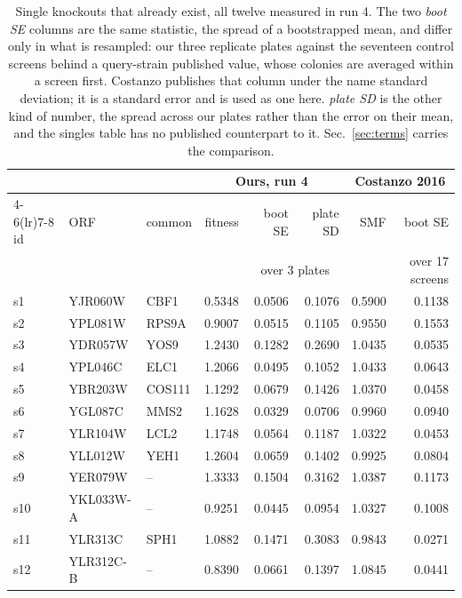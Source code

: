 \begin{table}[H]\centering
\footnotesize
\caption[]{Single knockouts that already exist, all twelve measured in run 4. The two \emph{boot SE} columns are the same statistic, the spread of a bootstrapped mean, and differ only in what is resampled: our three replicate plates against the seventeen control screens behind a query-strain published value, whose colonies are averaged within a screen first. Costanzo publishes that column under the name standard deviation; it is a standard error and is used as one here. \emph{plate SD} is the other kind of number, the spread across our plates rather than the error on their mean, and the singles table has no published counterpart to it. Sec.~\ref{sec:terms} carries the comparison.}\label{tab:existing-singles}
\begin{tabular}{lllrrrrr}
\toprule
& & & \multicolumn{3}{c}{Ours, run 4} & \multicolumn{2}{c}{Costanzo 2016} \\
\cmidrule(lr){4-6}\cmidrule(lr){7-8}
id & ORF & common & fitness & boot SE & plate SD & SMF & boot SE \\
 & & & & \multicolumn{2}{c}{\scriptsize over 3 plates} & & {\scriptsize over 17 screens} \\
\midrule
s1 & YJR060W & CBF1 & 0.5348 & 0.0506 & 0.1076 & 0.5900 & 0.1138 \\
s2 & YPL081W & RPS9A & 0.9007 & 0.0515 & 0.1105 & 0.9550 & 0.1553 \\
s3 & YDR057W & YOS9 & 1.2430 & 0.1282 & 0.2690 & 1.0435 & 0.0535 \\
s4 & YPL046C & ELC1 & 1.2066 & 0.0495 & 0.1052 & 1.0433 & 0.0643 \\
s5 & YBR203W & COS111 & 1.1292 & 0.0679 & 0.1426 & 1.0370 & 0.0458 \\
s6 & YGL087C & MMS2 & 1.1628 & 0.0329 & 0.0706 & 0.9960 & 0.0940 \\
s7 & YLR104W & LCL2 & 1.1748 & 0.0564 & 0.1187 & 1.0322 & 0.0453 \\
s8 & YLL012W & YEH1 & 1.2604 & 0.0659 & 0.1402 & 0.9925 & 0.0804 \\
s9 & YER079W & -- & 1.3333 & 0.1504 & 0.3162 & 1.0387 & 0.1173 \\
s10 & YKL033W-A & -- & 0.9251 & 0.0445 & 0.0954 & 1.0327 & 0.1008 \\
s11 & YLR313C & SPH1 & 1.0882 & 0.1471 & 0.3083 & 0.9843 & 0.0271 \\
s12 & YLR312C-B & -- & 0.8390 & 0.0661 & 0.1397 & 1.0845 & 0.0441 \\
\bottomrule
\end{tabular}
\end{table}
